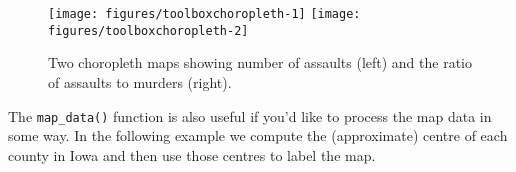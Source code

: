 \begin{Shaded}
\begin{Highlighting}[]
\NormalTok{(}\NormalTok{)}
\StringTok{ }\NormalTok{(}\NormalTok{)}
\StringTok{ }
\StringTok{ }\NormalTok{(}
\StringTok{ }\NormalTok{(}

\StringTok{ } \NormalTok{)}
\StringTok{ }\NormalTok{choro[}\NormalTok{(choro$order), ]}
  
    \NormalTok{)}
  
   \StringTok{ } \NormalTok{)}
\end{Highlighting}
\end{Shaded}

\begin{figure}

{\centering \texttt{[image: figures/toolboxchoropleth-1]} \texttt{[image: figures/toolboxchoropleth-2]} 

}

\caption{Two choropleth maps showing number of assaults (left) and the ratio of assaults to murders (right).\label{fig:choropleth}}
\end{figure}

The \texttt{map\_data()} function is also useful if you'd like to
process the map data in some way. In the following example we compute
the (approximate) centre of each county in Iowa and then use those
centres to label the map.

